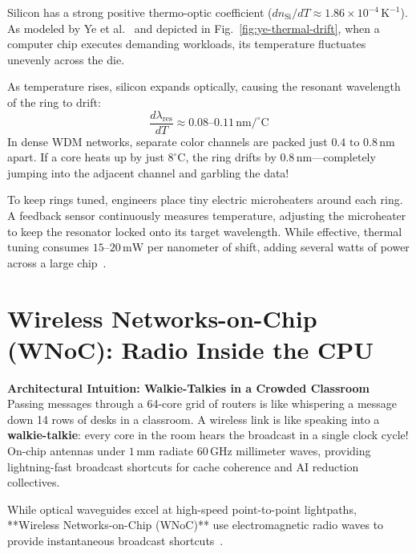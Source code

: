 Silicon has a strong positive thermo-optic coefficient ($dn_{\mathrm{Si}}/dT \approx 1.86 \times 10^{-4}\,\mathrm{K^{-1}}$). As modeled by Ye et al.~\cite{Ye2013} and depicted in Fig.~\ref{fig:ye-thermal-drift}, when a computer chip executes demanding workloads, its temperature fluctuates unevenly across the die.

As temperature rises, silicon expands optically, causing the resonant wavelength of the ring to drift:
\begin{equation}
    \frac{d\lambda_{\mathrm{res}}}{dT} \approx 0.08\text{--}0.11\,\mathrm{nm/^\circ C}
    \label{eq:resonance-drift}
\end{equation}
In dense WDM networks, separate color channels are packed just $0.4\text{ to }0.8\,\mathrm{nm}$ apart. If a core heats up by just $8^\circ\mathrm{C}$, the ring drifts by $0.8\,\mathrm{nm}$—completely jumping into the adjacent channel and garbling the data!~\cite{Ye2013,Wang2021ACO}

To keep rings tuned, engineers place tiny electric microheaters around each ring. A feedback sensor continuously measures temperature, adjusting the microheater to keep the resonator locked onto its target wavelength. While effective, thermal tuning consumes $15\text{--}20\,\mathrm{mW}$ per nanometer of shift, adding several watts of power across a large chip~\cite{Ye2013,Liu2025Energy}.

\section{Wireless Networks-on-Chip (WNoC): Radio Inside the CPU}
\label{sec:wnoc-foundations}

\begin{svgraybox}
\textbf{Architectural Intuition: Walkie-Talkies in a Crowded Classroom} \\
Passing messages through a 64-core grid of routers is like whispering a message down 14 rows of desks in a classroom. A wireless link is like speaking into a \textbf{walkie-talkie}: every core in the room hears the broadcast in a single clock cycle! On-chip antennas under $1\,\mathrm{mm}$ radiate $60\,\mathrm{GHz}$ millimeter waves, providing lightning-fast broadcast shortcuts for cache coherence and AI reduction collectives.
\end{svgraybox}

While optical waveguides excel at high-speed point-to-point lightpaths, **Wireless Networks-on-Chip (WNoC)** use electromagnetic radio waves to provide instantaneous broadcast shortcuts~\cite{Deb2012,Abadal2018}.

